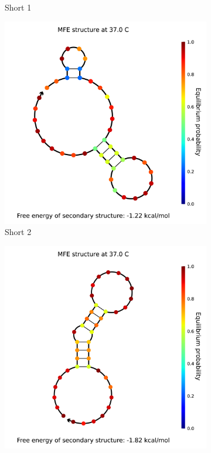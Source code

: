 \begin{figure}
\begin{subfigure}{.32\columnwidth}
  \caption{Short 1}
\end{subfigure}
\begin{subfigure}{.32\columnwidth}
  \centering
  \includegraphics[width=\linewidth]{images/2_analysis.png}
  \caption{Short 2}
\end{subfigure}
\begin{subfigure}{.32\columnwidth}
  \centering
  \includegraphics[width=\linewidth]{images/3_analysis.png}

\end{subfigure}
\end{figure}
